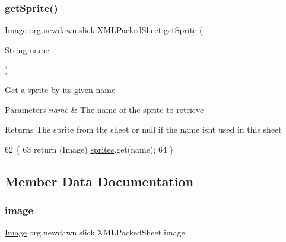 \subsubsection{\texorpdfstring{get\+Sprite()}{getSprite()}}
{\footnotesize\ttfamily \mbox{\hyperlink{classorg_1_1newdawn_1_1slick_1_1_image}{Image}} org.\+newdawn.\+slick.\+X\+M\+L\+Packed\+Sheet.\+get\+Sprite (\begin{DoxyParamCaption}\item[{String}]{name }\end{DoxyParamCaption})\hspace{0.3cm}{\ttfamily [inline]}}

Get a sprite by it\textquotesingle{}s given name


\begin{DoxyParams}{Parameters}
{\em name} & The name of the sprite to retrieve \\
\hline
\end{DoxyParams}
\begin{DoxyReturn}{Returns}
The sprite from the sheet or null if the name isn\textquotesingle{}t used in this sheet 
\end{DoxyReturn}

\begin{DoxyCode}
62                                         \{
63         \textcolor{keywordflow}{return} (Image) \mbox{\hyperlink{classorg_1_1newdawn_1_1slick_1_1_x_m_l_packed_sheet_a4afb6e9a66274013a24e53f4f01864bb}{sprites}}.get(name);
64     \}
\end{DoxyCode}


\subsection{Member Data Documentation}
\mbox{\label{classorg_1_1newdawn_1_1slick_1_1_x_m_l_packed_sheet_a8f418205fde15e4b3e64b363b74a7fae}} 
\subsubsection{\texorpdfstring{image}{image}}
{\footnotesize\ttfamily \mbox{\hyperlink{classorg_1_1newdawn_1_1slick_1_1_image}{Image}} org.\+newdawn.\+slick.\+X\+M\+L\+Packed\+Sheet.\+image\hspace{0.3cm}{\ttfamily [private]}}

